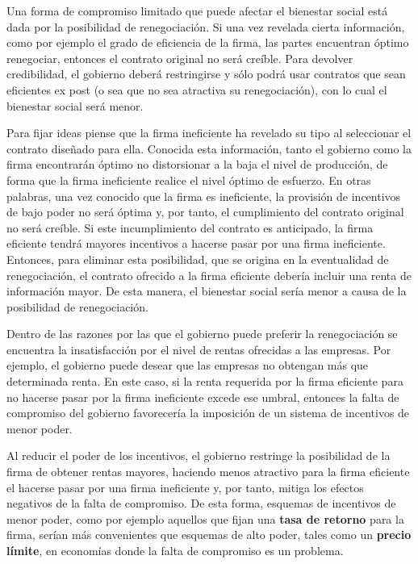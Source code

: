 \documentclass[
  12pt,
  spanish,
]{book}
\begin{document}
Una forma de compromiso limitado que puede afectar el bienestar social
está dada por la posibilidad de renegociación. Si una vez revelada
cierta información, como por ejemplo el grado de eficiencia de la firma,
las partes encuentran óptimo renegociar, entonces el contrato original
no será creíble. Para devolver credibilidad, el gobierno deberá
restringirse y sólo podrá usar contratos que sean eficientes ex post (o
sea que no sea atractiva su renegociación), con lo cual el bienestar
social será menor.

Para fijar ideas piense que la firma ineficiente ha revelado su tipo al
seleccionar el contrato diseñado para ella. Conocida esta información,
tanto el gobierno como la firma encontrarán óptimo no distorsionar a la
baja el nivel de producción, de forma que la firma ineficiente realice
el nivel óptimo de esfuerzo. En otras palabras, una vez conocido que la
firma es ineficiente, la provisión de incentivos de bajo poder no será
óptima y, por tanto, el cumplimiento del contrato original no será
creíble. Si este incumplimiento del contrato es anticipado, la firma
eficiente tendrá mayores incentivos a hacerse pasar por una firma
ineficiente. Entonces, para eliminar esta posibilidad, que se origina en
la eventualidad de renegociación, el contrato ofrecido a la firma
eficiente debería incluir una renta de información mayor. De esta
manera, el bienestar social sería menor a causa de la posibilidad de
renegociación.

Dentro de las razones por las que el gobierno puede preferir la
renegociación se encuentra la insatisfacción por el nivel de rentas
ofrecidas a las empresas. Por ejemplo, el gobierno puede desear que las
empresas no obtengan más que determinada renta. En este caso, si la
renta requerida por la firma eficiente para no hacerse pasar por la
firma ineficiente excede ese umbral, entonces la falta de compromiso del
gobierno favorecería la imposición de un sistema de incentivos de menor
poder.

Al reducir el poder de los incentivos, el gobierno restringe la
posibilidad de la firma de obtener rentas mayores, haciendo menos
atractivo para la firma eficiente el hacerse pasar por una firma
ineficiente y, por tanto, mitiga los efectos negativos de la falta de
compromiso. De esta forma, esquemas de incentivos de menor poder, como
por ejemplo aquellos que fijan una \textbf{tasa de retorno} para la
firma, serían más convenientes que esquemas de alto poder, tales como un
\textbf{precio límite}, en economías donde la falta de compromiso es un
problema.
\end{document}
